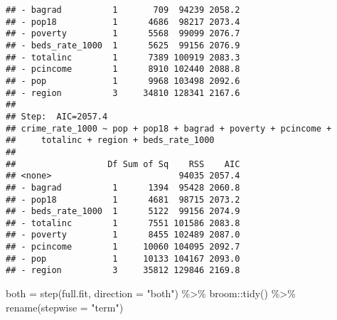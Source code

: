 \documentclass[
  11pt,
]{article}
\newenvironment{Shaded}{\begin{snugshade}}{\end{snugshade}}
\newcommand{\AttributeTok}[1]{\textcolor[rgb]{0.77,0.63,0.00}{#1}}
\newcommand{\FunctionTok}[1]{\textcolor[rgb]{0.00,0.00,0.00}{#1}}
\newcommand{\NormalTok}[1]{#1}
\newcommand{\OtherTok}[1]{\textcolor[rgb]{0.56,0.35,0.01}{#1}}
\newcommand{\SpecialCharTok}[1]{\textcolor[rgb]{0.00,0.00,0.00}{#1}}
\newcommand{\StringTok}[1]{\textcolor[rgb]{0.31,0.60,0.02}{#1}}
\begin{document}
\begin{verbatim}
## - bagrad          1       709  94239 2058.2
## - pop18           1      4686  98217 2073.4
## - poverty         1      5568  99099 2076.7
## - beds_rate_1000  1      5625  99156 2076.9
## - totalinc        1      7389 100919 2083.3
## - pcincome        1      8910 102440 2088.8
## - pop             1      9968 103498 2092.6
## - region          3     34810 128341 2167.6
## 
## Step:  AIC=2057.4
## crime_rate_1000 ~ pop + pop18 + bagrad + poverty + pcincome + 
##     totalinc + region + beds_rate_1000
## 
##                  Df Sum of Sq    RSS    AIC
## <none>                         94035 2057.4
## - bagrad          1      1394  95428 2060.8
## - pop18           1      4681  98715 2073.2
## - beds_rate_1000  1      5122  99156 2074.9
## - totalinc        1      7551 101586 2083.8
## - poverty         1      8455 102489 2087.0
## - pcincome        1     10060 104095 2092.7
## - pop             1     10133 104167 2093.0
## - region          3     35812 129846 2169.8
\end{verbatim}

\begin{Shaded}
\begin{Highlighting}[]
\NormalTok{both }\OtherTok{=} \FunctionTok{step}\NormalTok{(full.fit, }\AttributeTok{direction =} \StringTok{"both"}\NormalTok{) }\SpecialCharTok{\%\textgreater{}\%}\NormalTok{ broom}\SpecialCharTok{::}\FunctionTok{tidy}\NormalTok{() }\SpecialCharTok{\%\textgreater{}\%} \FunctionTok{rename}\NormalTok{(}\AttributeTok{stepwise =} \StringTok{"term"}\NormalTok{)}
\end{Highlighting}
\end{Shaded}
\end{document}
